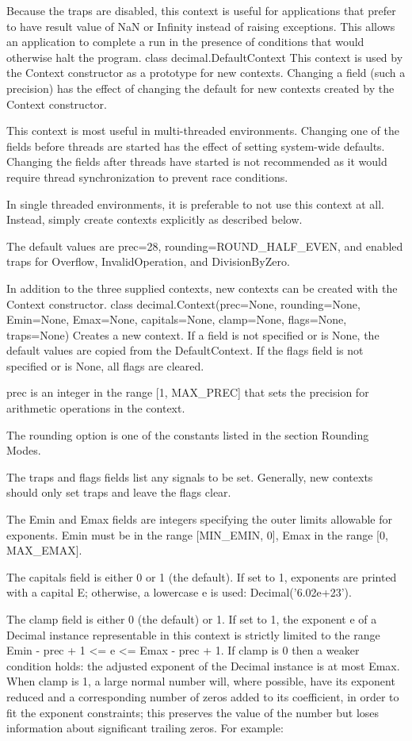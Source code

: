 Because the traps are disabled, this context is useful for applications that prefer to have result value of NaN or Infinity instead of raising exceptions. This allows an application to complete a run in the presence of conditions that would otherwise halt the program.
class decimal.DefaultContext
This context is used by the Context constructor as a prototype for new contexts. Changing a field (such a precision) has the effect of changing the default for new contexts created by the Context constructor.

This context is most useful in multi-threaded environments. Changing one of the fields before threads are started has the effect of setting system-wide defaults. Changing the fields after threads have started is not recommended as it would require thread synchronization to prevent race conditions.

In single threaded environments, it is preferable to not use this context at all. Instead, simply create contexts explicitly as described below.

The default values are prec=28, rounding=ROUND\_HALF\_EVEN, and enabled traps for Overflow, InvalidOperation, and DivisionByZero.

In addition to the three supplied contexts, new contexts can be created with the Context constructor.
class decimal.Context(prec=None, rounding=None, Emin=None, Emax=None, capitals=None, clamp=None, flags=None, traps=None)
Creates a new context. If a field is not specified or is None, the default values are copied from the DefaultContext. If the flags field is not specified or is None, all flags are cleared.

prec is an integer in the range [1, MAX\_PREC] that sets the precision for arithmetic operations in the context.

The rounding option is one of the constants listed in the section Rounding Modes.

The traps and flags fields list any signals to be set. Generally, new contexts should only set traps and leave the flags clear.

The Emin and Emax fields are integers specifying the outer limits allowable for exponents. Emin must be in the range [MIN\_EMIN, 0], Emax in the range [0, MAX\_EMAX].

The capitals field is either 0 or 1 (the default). If set to 1, exponents are printed with a capital E; otherwise, a lowercase e is used: Decimal('6.02e+23').

The clamp field is either 0 (the default) or 1. If set to 1, the exponent e of a Decimal instance representable in this context is strictly limited to the range Emin - prec + 1 <= e <= Emax - prec + 1. If clamp is 0 then a weaker condition holds: the adjusted exponent of the Decimal instance is at most Emax. When clamp is 1, a large normal number will, where possible, have its exponent reduced and a corresponding number of zeros added to its coefficient, in order to fit the exponent constraints; this preserves the value of the number but loses information about significant trailing zeros. For example:

